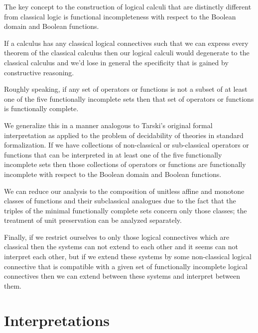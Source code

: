 \documentclass{article}
\begin{document}
\begin{center}
	\begin{flushleft}
		The key concept to the construction of logical calculi that are distinctly different from classical logic is functional incompleteness with respect to the Boolean domain and Boolean functions.
	\end{flushleft}
	\begin{flushleft}
		If a calculus has any classical logical connectives such that we can express every theorem of the classical calculus then our logical calculi would degenerate to the classical calculus and we'd lose in general the specificity that is gained by constructive reasoning.
	\end{flushleft}
	\begin{flushleft}
		Roughly speaking, if any set of operators or functions is not a subset of at least one of the five functionally incomplete sets then that set of operators or functions is functionally complete.
	\end{flushleft}
	\begin{flushleft}
		We generalize this in a manner analogous to Tarski's original formal interpretation as applied to the problem of decidability of theories in standard formalization. If we have collections of non-classical or sub-classical operators or functions that can be interpreted in at least one of the five functionally incomplete sets then those collections of operators or functions are functionally incomplete with respect to the Boolean domain and Boolean functions.
	\end{flushleft}
	\begin{flushleft}
	We can reduce our analysis to the composition of unitless affine and monotone classes of functions and their subclassical analogues due to the fact that the triples of the minimal functionally complete sets concern only those classes; the treatment of unit preservation can be analyzed separately.
	\end{flushleft}
	\begin{flushleft}
		Finally, if we restrict ourselves to only those logical connectives which are classical then the systems can not extend to each other and it seems can not interpret each other, but if we extend these systems by some non-classical logical connective that is compatible with a given set of functionally incomplete logical connectives then we can extend between these systems and interpret between them.
	\end{flushleft}
	\section{Interpretations}

\end{center}
\end{document}
